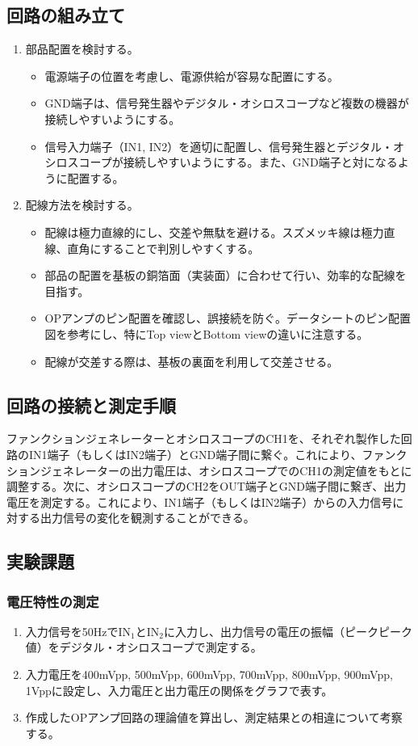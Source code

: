 \documentclass{jlreq}
\numberwithin{equation}{section}
\begin{document}
\subsection{回路の組み立て}
\begin{enumerate}
  \item 部品配置を検討する。
    \begin{itemize}
      \item 電源端子の位置を考慮し、電源供給が容易な配置にする。
      \item GND端子は、信号発生器やデジタル・オシロスコープなど複数の機器が接続しやすいようにする。
      \item 信号入力端子（IN1, IN2）を適切に配置し、信号発生器とデジタル・オシロスコープが接続しやすいようにする。また、GND端子と対になるように配置する。
    \end{itemize}
  \item 配線方法を検討する。
    \begin{itemize}
      \item 配線は極力直線的にし、交差や無駄を避ける。スズメッキ線は極力直線、直角にすることで判別しやすくする。
      \item 部品の配置を基板の銅箔面（実装面）に合わせて行い、効率的な配線を目指す。
      \item OPアンプのピン配置を確認し、誤接続を防ぐ。データシートのピン配置図を参考にし、特にTop viewとBottom viewの違いに注意する。
      \item 配線が交差する際は、基板の裏面を利用して交差させる。
    \end{itemize}
\end{enumerate}

\subsection{回路の接続と測定手順}
ファンクションジェネレーターとオシロスコープのCH1を、それぞれ製作した回路のIN1端子（もしくはIN2端子）とGND端子間に繋ぐ。これにより、ファンクションジェネレーターの出力電圧は、オシロスコープでのCH1の測定値をもとに調整する。次に、オシロスコープのCH2をOUT端子とGND端子間に繋ぎ、出力電圧を測定する。これにより、IN1端子（もしくはIN2端子）からの入力信号に対する出力信号の変化を観測することができる。

\subsection{実験課題}
\subsubsection{電圧特性の測定}
\begin{enumerate}
  \item 入力信号を50Hzで\(\text{IN}_1\)と\(\text{IN}_2\)に入力し、出力信号の電圧の振幅（ピークピーク値）をデジタル・オシロスコープで測定する。
  \item 入力電圧を400mVpp, 500mVpp, 600mVpp, 700mVpp, 800mVpp, 900mVpp, 1Vppに設定し、入力電圧と出力電圧の関係をグラフで表す。
  \item 作成したOPアンプ回路の理論値を算出し、測定結果との相違について考察する。
\end{enumerate}
\end{document}

